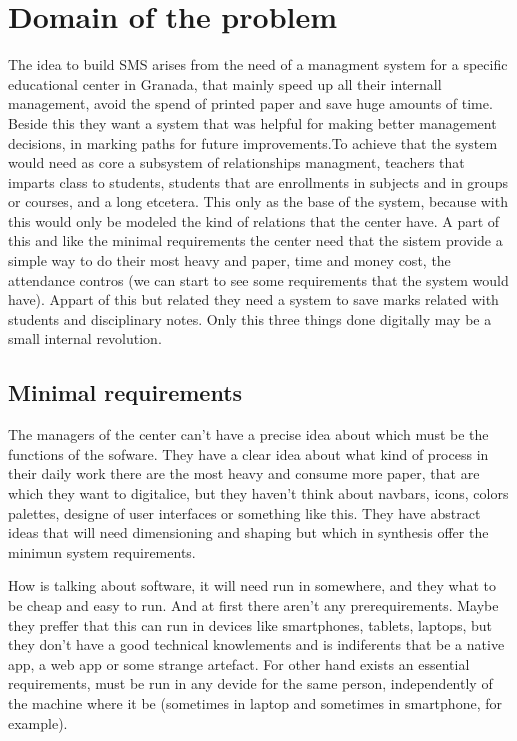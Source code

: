 \documentclass[oneside,english,titlepage]{scrbook}
\begin{document}
\section{Domain of the problem}

The idea to build SMS arises from the need of a managment system for
a specific educational center in Granada, that mainly speed up all
their internall management, avoid the spend of printed paper and save
huge amounts of time. Beside this they want a system that was helpful
for making better management decisions, in marking paths for future
improvements.\bigskip To achieve that the system would need as core
a subsystem of relationships managment, teachers that imparts class
to students, students that are enrollments in subjects and in groups
or courses, and a long etcetera. This only as the base of the system,
because with this would only be modeled the kind of relations that
the center have. A part of this and like the minimal requirements
the center need that the sistem provide a simple way to do their most
heavy and paper, time and money cost, the attendance contros (we can
start to see some requirements that the system would have). Appart
of this but related they need a system to save marks related with
students and disciplinary notes. Only this three things done digitally
may be a small internal revolution.

\subsection{Minimal requirements}

The managers of the center can't have a precise idea about which must be the functions of the sofware. They have a clear idea about what kind of process in their daily work there are the most heavy and consume more paper, that are which they want to digitalice, but they haven't think about navbars, icons, colors palettes, designe of user interfaces or something like this.  They have abstract ideas that will need dimensioning and shaping but which in synthesis offer the minimun system requirements.

\bigskip
{}
\bigskip

How is talking about software, it will need run in somewhere, and they what to be cheap and easy to run. And at first there aren't any prerequirements. Maybe they preffer that this can run in devices like smartphones, tablets, laptops, but they don't have a good technical knowlements and is indiferents that be a native app, a web app or some strange artefact.
For other hand exists an essential requirements, must be run in any devide for the same person, independently of the machine where it be (sometimes in laptop and sometimes in smartphone, for example).
\end{document}
